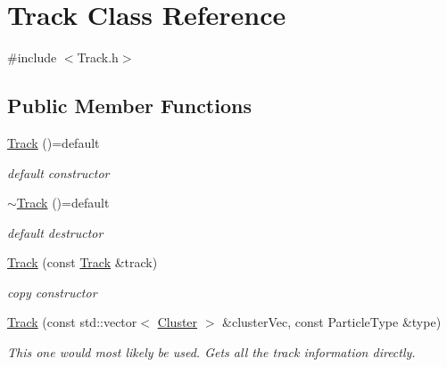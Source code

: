 \hypertarget{classTrack}{}\section{Track Class Reference}
\label{classTrack}


{\ttfamily \#include $<$Track.\+h$>$}

\subsection*{Public Member Functions}
\begin{DoxyCompactItemize}
\item 
\mbox{\label{classTrack_a2a52d978b2807a39d57a0da8fc4005b4}} 
\hyperlink{classTrack_a2a52d978b2807a39d57a0da8fc4005b4}{Track} ()=default
\begin{DoxyCompactList}\small\item\em default constructor \end{DoxyCompactList}\item 
\mbox{\label{classTrack_a45d31a87679b4c25394cf2c033efe433}} 
\hyperlink{classTrack_a45d31a87679b4c25394cf2c033efe433}{$\sim$\+Track} ()=default
\begin{DoxyCompactList}\small\item\em default destructor \end{DoxyCompactList}\item 
\mbox{\label{classTrack_af3f36730738d5352675621ea3ef42cae}} 
\hyperlink{classTrack_af3f36730738d5352675621ea3ef42cae}{Track} (const \hyperlink{classTrack}{Track} \&track)
\begin{DoxyCompactList}\small\item\em copy constructor \end{DoxyCompactList}\item 
\mbox{\label{classTrack_a3777cb4b1dcf3bf7386dc2b54373e4b5}} 
\hyperlink{classTrack_a3777cb4b1dcf3bf7386dc2b54373e4b5}{Track} (const std\+::vector$<$ \hyperlink{classCluster}{Cluster} $>$ \&cluster\+Vec, const Particle\+Type \&type)
\begin{DoxyCompactList}\small\item\em This one would most likely be used. Gets all the track information directly. \end{DoxyCompactList}\item 

\end{DoxyCompactItemize}
